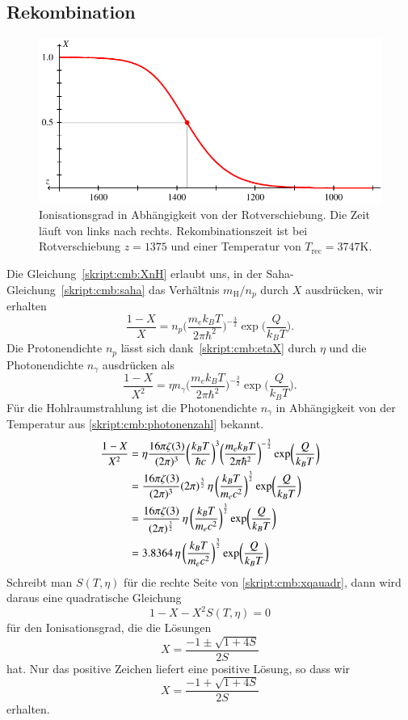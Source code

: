 \subsection{Rekombination}
\begin{figure}
\centering
\includegraphics{chapters/tikz/rekombination.pdf}
\caption{Ionisationsgrad in Abhängigkeit von der Rotverschiebung.
Die Zeit läuft von links nach rechts.
Rekombinationszeit ist bei Rotverschiebung $z=1375$ und einer Temperatur
von $T_{\text{rec}}=3747\text{K}$.
\label{skript:cmb:rekombinationgraph}}
\end{figure}
Die Gleichung~\eqref{skript:cmb:XnH} erlaubt uns, in der
Saha-Gleichung~\eqref{skript:cmb:saha} das Verhältnis $m_\text{H}/n_p$
durch $X$ ausdrücken, wir erhalten
\begin{equation}
\frac{1-X}{X}
=
n_p
\biggl(\frac{m_ek_BT}{2\pi \hbar^2}\biggr)^{-\frac32}
\exp\biggl( \frac{Q}{k_BT} \biggr).
\end{equation}
Die Protonendichte $n_p$ lässt sich dank~\eqref{skript:cmb:etaX}
durch $\eta$ und die Photonendichte $n_\gamma$ ausdrücken als
\[
\frac{1-X}{X^2}=\eta n_\gamma
\biggl(\frac{m_ek_BT}{2\pi \hbar^2}\biggr)^{-\frac32}
\exp\biggl( \frac{Q}{k_BT} \biggr).
\]
Für die Hohlraumstrahlung ist die Photonendichte $n_\gamma$ in Abhängigkeit
von der Temperatur aus \eqref{skript:cmb:photonenzahl} bekannt.
\begin{align}
\frac{1-X}{X^2}
&=\eta
\frac{16\pi\zeta(3)}{(2\pi)^3}
\biggl(\frac{k_BT}{\hbar c}\biggr)^3
\biggl(\frac{m_ek_BT}{2\pi \hbar^2}\biggr)^{-\frac32}
\exp\biggl( \frac{Q}{k_BT} \biggr)
\notag
\\
&=
\frac{16\pi\zeta(3)}{(2\pi)^3}(2\pi)^{\frac32}
\,
\eta
\,
\biggl(\frac{k_BT}{m_ec^2}\biggr)^{\frac32}
\exp\biggl( \frac{Q}{k_BT} \biggr)
\\
&=
\frac{16\pi\zeta(3)}{(2\pi)^{\frac32}}
\,
\eta
\,
\biggl(\frac{k_BT}{m_ec^2}\biggr)^{\frac32}
\exp\biggl( \frac{Q}{k_BT} \biggr)
\\
&=
3.8364
\,
\eta
\,
\biggl(\frac{k_BT}{m_ec^2}\biggr)^{\frac32}
\exp\biggl( \frac{Q}{k_BT} \biggr)
\label{skript:cmb:xqauadr}
\end{align}
Schreibt man $S(T,\eta)$ für die rechte Seite von \eqref{skript:cmb:xqauadr},
dann wird daraus eine quadratische Gleichung
\[
1-X-X^2 S(T,\eta)=0
\]
für den Ionisationsgrad, die die Lösungen
\[
X = \frac{-1\pm\sqrt{1+4S}}{2S}
\]
hat.
Nur das positive Zeichen liefert eine positive Lösung, so dass wir
\[
X=\frac{-1+\sqrt{1+4S}}{2S}
\]
erhalten.

